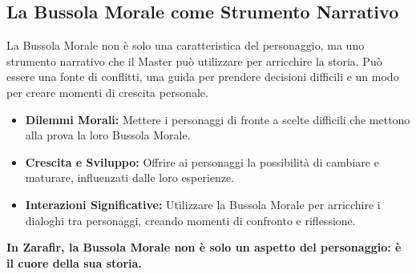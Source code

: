 \documentclass[../manuale_main.tex]{subfiles}
\begin{document}
\vspace{0.3cm}

\subsection{La Bussola Morale come Strumento Narrativo}
La Bussola Morale non è solo una caratteristica del personaggio, ma uno strumento narrativo che il Master può utilizzare per arricchire la storia. Può essere una fonte di conflitti, una guida per prendere decisioni difficili e un modo per creare momenti di crescita personale.

\begin{itemize}
    \item \textbf{Dilemmi Morali:} Mettere i personaggi di fronte a scelte difficili che mettono alla prova la loro Bussola Morale.
    \item \textbf{Crescita e Sviluppo:} Offrire ai personaggi la possibilità di cambiare e maturare, influenzati dalle loro esperienze.
    \item \textbf{Interazioni Significative:} Utilizzare la Bussola Morale per arricchire i dialoghi tra personaggi, creando momenti di confronto e riflessione.
\end{itemize}

\vspace{0.3cm}

\textbf{In Zarafir, la Bussola Morale non è solo un aspetto del personaggio: è il cuore della sua storia.}
\end{document}

